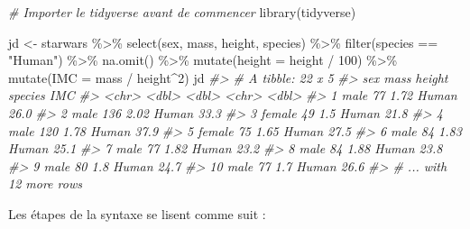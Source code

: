 \documentclass[
]{book}
\newenvironment{Shaded}{}{}
\newcommand{\AttributeTok}[1]{#1}
\newcommand{\CommentTok}[1]{\textit{#1}}
\newcommand{\DecValTok}[1]{#1}
\newcommand{\FunctionTok}[1]{#1}
\newcommand{\NormalTok}[1]{#1}
\newcommand{\OtherTok}[1]{#1}
\newcommand{\SpecialCharTok}[1]{#1}
\newcommand{\StringTok}[1]{#1}
\begin{document}
\begin{Shaded}
\begin{Highlighting}[]
\CommentTok{\# Importer le tidyverse avant de commencer}
\FunctionTok{library}\NormalTok{(tidyverse)}

\NormalTok{jd }\OtherTok{\textless{}{-}}\NormalTok{  starwars }\SpecialCharTok{\%\textgreater{}\%} 
  \FunctionTok{select}\NormalTok{(sex, mass, height, species) }\SpecialCharTok{\%\textgreater{}\%} 
  \FunctionTok{filter}\NormalTok{(species }\SpecialCharTok{==} \StringTok{"Human"}\NormalTok{) }\SpecialCharTok{\%\textgreater{}\%} 
  \FunctionTok{na.omit}\NormalTok{() }\SpecialCharTok{\%\textgreater{}\%} 
  \FunctionTok{mutate}\NormalTok{(}\AttributeTok{height =}\NormalTok{ height  }\SpecialCharTok{/} \DecValTok{100}\NormalTok{) }\SpecialCharTok{\%\textgreater{}\%} 
  \FunctionTok{mutate}\NormalTok{(}\AttributeTok{IMC =}\NormalTok{ mass }\SpecialCharTok{/}\NormalTok{ height}\SpecialCharTok{\^{}}\DecValTok{2}\NormalTok{)  }
\NormalTok{jd}
\CommentTok{\#\textgreater{} \# A tibble: 22 x 5}
\CommentTok{\#\textgreater{}    sex     mass height species   IMC}
\CommentTok{\#\textgreater{}    \textless{}chr\textgreater{}  \textless{}dbl\textgreater{}  \textless{}dbl\textgreater{} \textless{}chr\textgreater{}   \textless{}dbl\textgreater{}}
\CommentTok{\#\textgreater{}  1 male      77   1.72 Human    26.0}
\CommentTok{\#\textgreater{}  2 male     136   2.02 Human    33.3}
\CommentTok{\#\textgreater{}  3 female    49   1.5  Human    21.8}
\CommentTok{\#\textgreater{}  4 male     120   1.78 Human    37.9}
\CommentTok{\#\textgreater{}  5 female    75   1.65 Human    27.5}
\CommentTok{\#\textgreater{}  6 male      84   1.83 Human    25.1}
\CommentTok{\#\textgreater{}  7 male      77   1.82 Human    23.2}
\CommentTok{\#\textgreater{}  8 male      84   1.88 Human    23.8}
\CommentTok{\#\textgreater{}  9 male      80   1.8  Human    24.7}
\CommentTok{\#\textgreater{} 10 male      77   1.7  Human    26.6}
\CommentTok{\#\textgreater{} \# ... with 12 more rows}
\end{Highlighting}
\end{Shaded}

Les étapes de la syntaxe se lisent comme suit :
\end{document}

